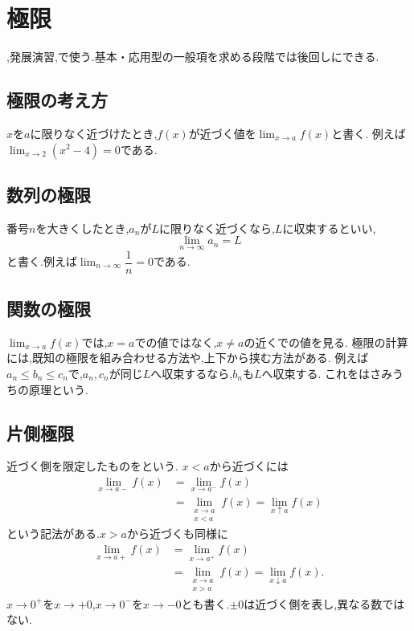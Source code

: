 
\section{極限}\label{節：極限}
  ,発展演習,で使う.基本・応用型の一般項を求める段階では後回しにできる.

  \subsection{極限の考え方}\label{節：極限：極限}
    $x$を$a$に限りなく近づけたとき,$f(x)$が近づく値を$\lim_{x\to a}f(x)$と書く.
    例えば$\lim_{x\to2}(x^2-4)=0$である.

  \subsection{数列の極限}\label{節：数列の極限}
    番号$n$を大きくしたとき,$a_n$が$L$に限りなく近づくなら,$L$に収束するといい,
    \[
      \lim_{n\to\infty}a_n=L
    \]
    と書く.例えば$\lim_{n\to\infty}\dfrac{1}{n}=0$である.

  \subsection{関数の極限}\label{節：関数の極限}
    $\lim_{x\to a}f(x)$では,$x=a$での値ではなく,$x\ne a$の近くでの値を見る.
    極限の計算には,既知の極限を組み合わせる方法や,上下から挟む方法がある.
    例えば$a_n\le b_n\le c_n$で,$a_n,c_n$が同じ$L$へ収束するなら,$b_n$も$L$へ収束する.
    これをはさみうちの原理という.

  \subsection{片側極限}\label{節：片側極限}
    近づく側を限定したものを\textbf{}という.
    $x<a$から近づく\textbf{}には
    \[
      \begin{aligned}
        \lim_{x\to a-}f(x)&=\lim_{x\to a^-}f(x)\\
        &=\lim_{\substack{x\to a\\x<a}}f(x)=\lim_{x\uparrow a}f(x)
      \end{aligned}
    \]
    という記法がある.$x>a$から近づく\textbf{}も同様に
    \[
      \begin{aligned}
        \lim_{x\to a+}f(x)&=\lim_{x\to a^+}f(x)\\
        &=\lim_{\substack{x\to a\\x>a}}f(x)=\lim_{x\downarrow a}f(x).
      \end{aligned}
    \]
    $x\to0^+$を$x\to+0$,$x\to0^-$を$x\to-0$とも書く.$\pm0$は近づく側を表し,異なる数ではない.

